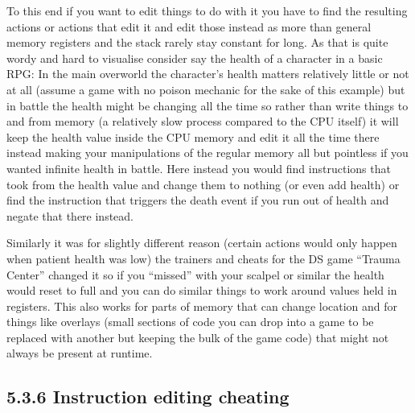 \documentclass[
]{book}
\begin{document}
To this end if you want to edit things to do with it you have to find the resulting actions or actions that edit it and edit those instead as more than general memory registers and the stack rarely stay constant for long. As that is quite wordy and hard to visualise consider say the health of a character in a basic RPG: In the main overworld the character's health matters relatively little or not at all (assume a game with no poison mechanic for the sake of this example) but in battle the health might be changing all the time so rather than write things to and from memory (a relatively slow process compared to the CPU itself) it will keep the health value inside the CPU memory and edit it all the time there instead making your manipulations of the regular memory all but pointless if you wanted infinite health in battle. Here instead you would find instructions that took from the health value and change them to nothing (or even add health) or find the instruction that triggers the death event if you run out of health and negate that there instead.

Similarly it was for slightly different reason (certain actions would only happen when patient health was low) the trainers and cheats for the DS game ``Trauma Center'' changed it so if you ``missed'' with your scalpel or similar the health would reset to full and you can do similar things to work around values held in registers. This also works for parts of memory that can change location and for things like overlays (small sections of code you can drop into a game to be replaced with another but keeping the bulk of the game code) that might not always be present at runtime.

\hypertarget{instruction-editing-cheating}{%
\subsection{5.3.6 Instruction editing cheating}\label{instruction-editing-cheating}}
\end{document}
